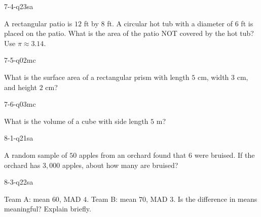 \begin{practiceQuestion}{7-4-q23}{sa}
\begin{questionText}
A rectangular patio is $12$ ft by $8$ ft. A circular hot tub with a diameter of $6$ ft is placed on the patio. What is the area of the patio NOT covered by the hot tub? Use $\pi \approx 3.14$.
\end{questionText}
\end{practiceQuestion}

\begin{practiceQuestion}{7-5-q02}{mc}
\begin{questionText}
What is the surface area of a rectangular prism with length $5$ cm, width $3$ cm, and height $2$ cm?
\end{questionText}
\end{practiceQuestion}

\begin{practiceQuestion}{7-6-q03}{mc}
\begin{questionText}
What is the volume of a cube with side length $5$ m?
\end{questionText}
\end{practiceQuestion}

\begin{practiceQuestion}{8-1-q21}{sa}
\begin{questionText}
A random sample of $50$ apples from an orchard found that $6$ were bruised. If the orchard has $3{,}000$ apples, about how many are bruised?
\end{questionText}
\end{practiceQuestion}

\begin{practiceQuestion}{8-3-q22}{sa}
\begin{questionText}
Team A: mean $60$, MAD $4$. Team B: mean $70$, MAD $3$. Is the difference in means meaningful? Explain briefly.
\end{questionText}
\end{practiceQuestion}

